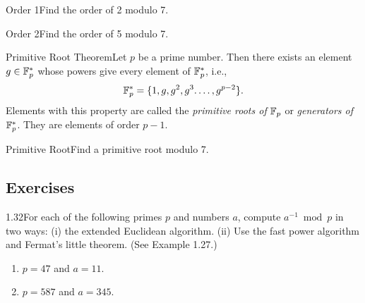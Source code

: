 \begin{example}
    {Order 1}Find the order of 2 modulo 7.
\end{example}


\begin{example}
    {Order 2}Find the order of 5 modulo 7.
\end{example}


\begin{theorem}
    {Primitive Root Theorem}Let \(p\) be a prime number. Then there exists an element \(g \in \mathbb{F}_p^*\) whose powers give every element of \(\mathbb{F}_p^*\), i.e., \[\mathbb{F}_p^* = \{1,g,g^2,g^3.\dots,g^{p - 2}\}.\] Elements with this property are called the \textit{primitive roots of} \(\mathbb{F}_p\) or \textit{generators of} \(\mathbb{F}_p^*\). They are elements of order \(p - 1\).
\end{theorem}

\newpage

\begin{example}
    {Primitive Root}Find a primitive root modulo 7.
\end{example}


\renewcommand{\theenumi}{\alph{enumi}}
\renewcommand{\labelenumi}{(\theenumi)}
\subsection{Exercises}

\begin{exercise}
    {1.32}For each of the following primes \( p \) and numbers \( a \), compute \( a^{-1} \bmod p \) in two ways: (i) the extended Euclidean algorithm. (ii) Use the fast power algorithm and Fermat's little theorem. (See Example 1.27.)
    \begin{enumerate}
        \item \( p = 47 \) and \( a = 11 \).
        \item \( p = 587 \) and \( a = 345 \).
    \end{enumerate}
\end{exercise}

